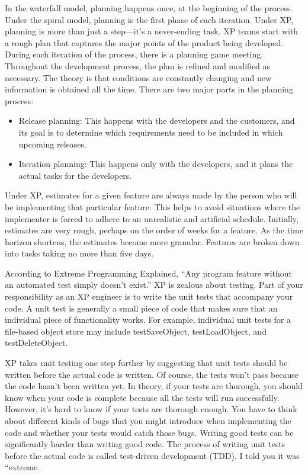 
In the waterfall model, planning happens once, at the beginning of the process. Under the spiral model, planning is the first phase of each iteration. Under XP, planning is more than just a step—it’s a never-ending task. XP teams start with a rough plan that captures the major points of the product being developed. During each iteration of the process, there is a planning game meeting. Throughout the development process, the plan is refined and modified as necessary. The theory is that conditions are constantly changing and new information is obtained all the time. There are two major parts in the planning process:

\begin{itemize}
\item
Release planning: This happens with the developers and the customers, and its goal is to determine which requirements need to be included in which upcoming releases.

\item
Iteration planning: This happens only with the developers, and it plans the actual tasks for the developers.
\end{itemize}

Under XP, estimates for a given feature are always made by the person who will be implementing that particular feature. This helps to avoid situations where the implementer is forced to adhere to an unrealistic and artificial schedule. Initially, estimates are very rough, perhaps on the order of weeks for a feature. As the time horizon shortens, the estimates become more granular. Features are broken down into tasks taking no more than five days.


According to Extreme Programming Explained, “Any program feature without an automated test simply doesn’t exist.” XP is zealous about testing. Part of your responsibility as an XP engineer is to write the unit tests that accompany your code. A unit test is generally a small piece of code that makes sure that an individual piece of functionality works. For example, individual unit tests for a file-based object store may include testSaveObject, testLoadObject, and testDeleteObject.

XP takes unit testing one step further by suggesting that unit tests should be written before the actual code is written. Of course, the tests won’t pass because the code hasn’t been written yet. In theory, if your tests are thorough, you should know when your code is complete because all the tests will run successfully. However, it’s hard to know if your tests are thorough enough. You have to think about different kinds of bugs that you might introduce when implementing the code and whether your tests would catch those bugs. Writing good tests can be significantly harder than writing good code. The process of writing unit tests before the actual code is called test-driven development (TDD). I told you it was “extreme.

